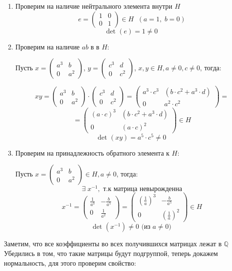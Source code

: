 \documentclass[a4paper,12pt]{article}
\begin{document}
\begin{enumerate}
\item Проверим на наличие нейтрального элемента внутри $H$
\[
e = \begin{pmatrix}
1& 0 \\ 0 & 1
\end{pmatrix} \in H \; \;(a = 1, \; b = 0)
\]
\[
\text{det } (e) = 1 \neq 0
\]
\item Проверим на наличие $ab$ в в $H$:


Пусть $x = \begin{pmatrix}
a^3 & b \\ 0 & a^2
\end{pmatrix}
$, $y = \begin{pmatrix}
c^3 & d \\ 0 & c^2
\end{pmatrix}
$, $x, y \in H, a \neq 0, c \neq 0$, тогда:


\[
xy = \begin{pmatrix}
a^3 & b \\ 0 & a^2
\end{pmatrix} \cdot \begin{pmatrix}
c^3 & d \\ 0 & c^2
\end{pmatrix} = \left(\begin{matrix}
a^3\cdot c^3 & \left(b \cdot c^2+a^3 \cdot d  \right) \\
0 & a^2 \cdot c^2
\end{matrix}\right) = 
\]
\[
=
\left(\begin{matrix}
(a\cdot c )^3& \left(b \cdot c^2+a^3 \cdot d  \right) \\
0 & (a\cdot c)^2
\end{matrix}\right) \in H 
\]
\[
\text{det } (xy) = a^5 \cdot c^5 \neq 0
\]
\item Проверим на принадлежность обратного элемента к $H$:

Пусть $
x = \begin{pmatrix}
a^3 & b \\0 & a^2
\end{pmatrix} \in H, a \neq 0
$, тогда:
\[
\exists \; x^{-1}, \text{ т.к матрица невырожденна}
\]
\[
x^{-1} = \begin{pmatrix}
\frac{1}{a^3} & -\frac{b}{a^5} \\0 & \frac{1}{a^2}
\end{pmatrix}
=
\begin{pmatrix}
\left( \frac{1}{a}  \right)^3& -\frac{b}{a^5} \\0 & \left( \frac{1}{a} \right)^2
\end{pmatrix} \in H
\] 
\[
\text{det } (x^{-1}) \neq 0 \text{ (из $a \neq 0$)}
\]
\end{enumerate}
Заметим, что все коэффициенты во всех получившихся матрицах лежат в $\mathbb{Q}$
\clearpage
Убедились в том, что такие матрицы будут подгруппой, теперь докажем нормальность, для этого проверим свойство:
\end{document}
